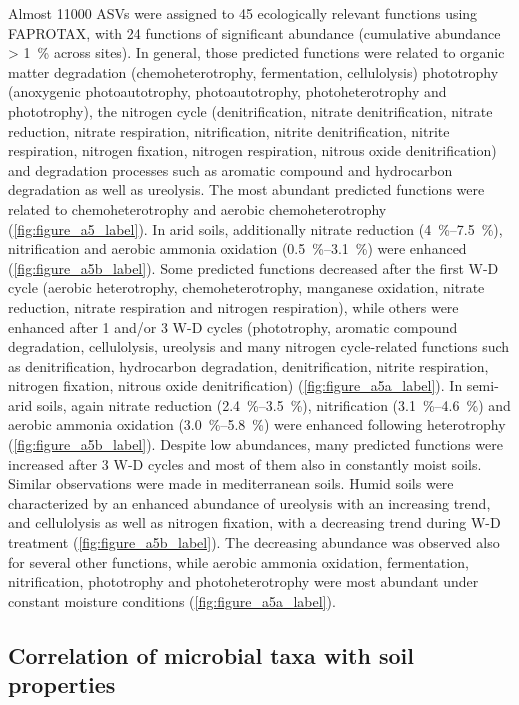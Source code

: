 Almost \num{11000} ASVs were assigned to 45 ecologically relevant functions using FAPROTAX, with 24 functions of significant abundance (cumulative abundance \SI{> 1}{\percent} across sites). 
In general, those predicted functions were related to organic matter degradation (chemoheterotrophy, fermentation, cellulolysis) phototrophy (anoxygenic photoautotrophy, photoautotrophy, photoheterotrophy and phototrophy), the nitrogen cycle (denitrification, nitrate denitrification, nitrate reduction, nitrate respiration, nitrification, nitrite denitrification, nitrite respiration, nitrogen fixation, nitrogen respiration, nitrous oxide denitrification) and degradation processes such as aromatic compound and hydrocarbon degradation as well as ureolysis. 
The most abundant predicted functions were related to chemoheterotrophy and aerobic chemoheterotrophy (\cref{fig:figure_a5_label}). 
In arid soils, additionally nitrate reduction (\SIrange{4}{7.5}{\percent}), nitrification and aerobic ammonia oxidation (\SIrange{0.5}{3.1}{\percent}) were enhanced (\cref{fig:figure_a5b_label}). 
Some predicted functions decreased after the first W-D cycle (aerobic heterotrophy, chemoheterotrophy, manganese oxidation, nitrate reduction, nitrate respiration and nitrogen respiration), while others were enhanced after 1 and/or 3 W-D cycles (phototrophy, aromatic compound degradation, cellulolysis, ureolysis and many nitrogen cycle-related functions such as denitrification, hydrocarbon degradation, denitrification, nitrite respiration, nitrogen fixation, nitrous oxide denitrification) (\cref{fig:figure_a5a_label}). 
In semi-arid soils, again nitrate reduction (\SIrange{2.4}{3.5}{\percent}), nitrification (\SIrange{3.1}{4.6}{\percent}) and aerobic ammonia oxidation (\SIrange{3.0}{5.8}{\percent}) were enhanced following heterotrophy (\cref{fig:figure_a5b_label}). 
Despite low abundances, many predicted functions were increased after 3 W-D cycles and most of them also in constantly moist soils. 
Similar observations were made in mediterranean soils. 
Humid soils were characterized by an enhanced abundance of ureolysis with an increasing trend, and cellulolysis as well as nitrogen fixation, with a decreasing trend during W-D treatment (\cref{fig:figure_a5b_label}). 
The decreasing abundance was observed also for several other functions, while aerobic ammonia oxidation, fermentation, nitrification, phototrophy and photoheterotrophy were most abundant under constant moisture conditions (\cref{fig:figure_a5a_label}).

\subsection{Correlation of microbial taxa with soil properties}

